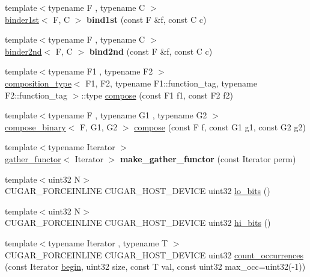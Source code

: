 \begin{DoxyCompactItemize}
\item 
{\footnotesize template$<$typename F , typename C $>$ }\\\hyperlink{structcugar_1_1binder1st}{binder1st}$<$ F, C $>$ {\bfseries bind1st} (const F \&f, const C c)
\item 
{\footnotesize template$<$typename F , typename C $>$ }\\\hyperlink{structcugar_1_1binder2nd}{binder2nd}$<$ F, C $>$ {\bfseries bind2nd} (const F \&f, const C c)
\item 
{\footnotesize template$<$typename F1 , typename F2 $>$ }\\\hyperlink{structcugar_1_1composition__type}{composition\+\_\+type}$<$ F1, F2, typename F1\+::function\+\_\+tag, typename F2\+::function\+\_\+tag $>$\+::type \hyperlink{group___basic_functors_ga3f7ecfc55f5d92661c8cb23428d52f7b}{compose} (const F1 f1, const F2 f2)
\item 
{\footnotesize template$<$typename F , typename G1 , typename G2 $>$ }\\\hyperlink{structcugar_1_1compose__binary}{compose\+\_\+binary}$<$ F, G1, G2 $>$ \hyperlink{group___basic_functors_gadbd492970eb013a975551b9cf4b846fe}{compose} (const F f, const G1 g1, const G2 g2)
\item 
{\footnotesize template$<$typename Iterator $>$ }\\\hyperlink{structcugar_1_1gather__functor}{gather\+\_\+functor}$<$ Iterator $>$ {\bfseries make\+\_\+gather\+\_\+functor} (const Iterator perm)
\item 
{\footnotesize template$<$uint32 N$>$ }\\C\+U\+G\+A\+R\+\_\+\+F\+O\+R\+C\+E\+I\+N\+L\+I\+NE C\+U\+G\+A\+R\+\_\+\+H\+O\+S\+T\+\_\+\+D\+E\+V\+I\+CE uint32 \hyperlink{group___basic_utils_gaf1c33dd2c16b4650bae4a033c14f39a5}{lo\+\_\+bits} ()
\item 
{\footnotesize template$<$uint32 N$>$ }\\C\+U\+G\+A\+R\+\_\+\+F\+O\+R\+C\+E\+I\+N\+L\+I\+NE C\+U\+G\+A\+R\+\_\+\+H\+O\+S\+T\+\_\+\+D\+E\+V\+I\+CE uint32 \hyperlink{group___basic_utils_ga47492a6dcbe7be467ffda1dd9ad48fb8}{hi\+\_\+bits} ()
\item 
{\footnotesize template$<$typename Iterator , typename T $>$ }\\C\+U\+G\+A\+R\+\_\+\+F\+O\+R\+C\+E\+I\+N\+L\+I\+NE C\+U\+G\+A\+R\+\_\+\+H\+O\+S\+T\+\_\+\+D\+E\+V\+I\+CE uint32 \hyperlink{group___basic_utils_gae983de927851c298a386b9a35b0e82e4}{count\+\_\+occurrences} (const Iterator \hyperlink{namespacecugar_a2121df08f967e232ea5fe0ee378dee67}{begin}, uint32 size, const T val, const uint32 max\+\_\+occ=uint32(-\/1))

\end{DoxyCompactItemize}
